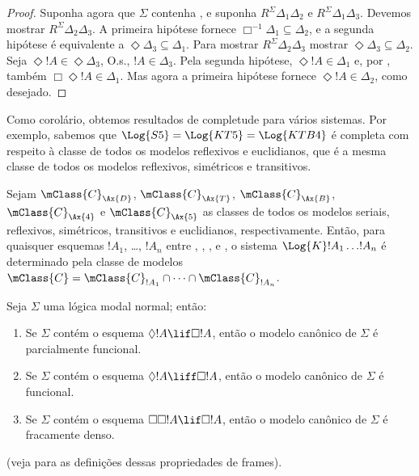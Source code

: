 \documentclass[../../../include/open-logic-section]{subfiles}
\begin{document}
\begin{proof}
  Suponha agora que $\Sigma$ contenha , e suponha
  $R^\Sigma \Delta_1\Delta_2$ e $R^\Sigma \Delta_1\Delta_3$. Devemos
  mostrar $R^\Sigma \Delta_2\Delta_3$. A primeira hipótese fornece
  $\Box^{-1}\Delta_1 \subseteq \Delta_2$, e a segunda hipótese é
  equivalente a $\Diamond\Delta_3 \subseteq \Delta_1$. Para mostrar $R^\Sigma
  \Delta_2\Delta_3$
  mostrar $\Diamond\Delta_3 \subseteq \Delta_2$. Seja
  $\Diamond!A \in \Diamond\Delta_3$, O.s.\@, $!A \in \Delta_3$. Pela
  segunda hipótese, $\Diamond!A \in \Delta_1$ e, por , também
  $\Box\Diamond!A \in \Delta_1$. Mas agora a primeira hipótese fornece
  $\Diamond!A \in \Delta_2$, como desejado.
  \end{proof}

Como corolário, obtemos resultados de completude para vários sistemas.
Por exemplo, sabemos que $\Log{S5} = \Log{KT5} = \Log{KTB4}$ é
completa com respeito à classe de todos os modelos reflexivos e
euclidianos, que é a mesma classe de todos os modelos reflexivos,
simétricos e transitivos.

\begin{thm}
  Sejam $\mClass{C}_\Ax{D}$, $\mClass{C}_\Ax{T}$,
  $\mClass{C}_\Ax{B}$, $\mClass{C}_\Ax{4}$ e
  $\mClass{C}_\Ax{5}$ as classes de todos os modelos seriais,
  reflexivos, simétricos, transitivos e euclidianos, respectivamente.
  Então, para quaisquer esquemas $!A_1$, \dots, $!A_n$ entre ,
  , ,  e , o sistema
  $\Log{K}!A_1 \dots !A_n$ é determinado pela classe de modelos
  $\mClass{C} = \mClass{C}_{!A_1} \cap \dots
  \cap \mClass{C}_{!A_n}$. 
\end{thm}

\begin{prop}
  Seja $\Sigma$ uma lógica modal normal; então:
  \begin{enumerate}
  \item{}%
    Se $\Sigma$ contém o esquema $\Diamond!A \lif \Box
    !A$, então o modelo canônico de $\Sigma$ é parcialmente funcional.
  \item Se $\Sigma$ contém o esquema $\Diamond!A \liff \Box
    !A$, então o modelo canônico de $\Sigma$ é funcional.
  \item Se $\Sigma$ contém o esquema $\Box\Box!A \lif \Box
    !A$, então o modelo canônico de $\Sigma$ é fracamente denso.
  \end{enumerate}
(veja  para as definições dessas
  propriedades de frames).
\end{prop}
\end{document}
